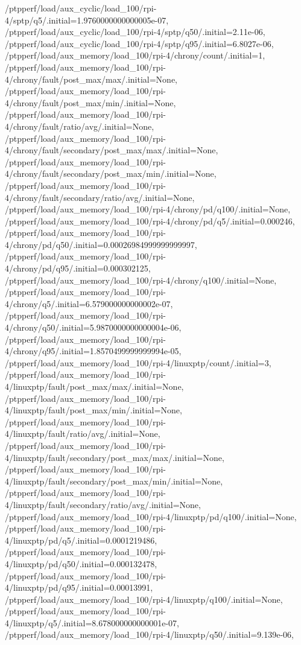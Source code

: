 {    /ptpperf/load/aux_cyclic/load_100/rpi-4/sptp/q5/.initial=1.9760000000000005e-07,
    /ptpperf/load/aux_cyclic/load_100/rpi-4/sptp/q50/.initial=2.11e-06,
    /ptpperf/load/aux_cyclic/load_100/rpi-4/sptp/q95/.initial=6.8027e-06,
    /ptpperf/load/aux_memory/load_100/rpi-4/chrony/count/.initial=1,
    /ptpperf/load/aux_memory/load_100/rpi-4/chrony/fault/post_max/max/.initial=None,
    /ptpperf/load/aux_memory/load_100/rpi-4/chrony/fault/post_max/min/.initial=None,
    /ptpperf/load/aux_memory/load_100/rpi-4/chrony/fault/ratio/avg/.initial=None,
    /ptpperf/load/aux_memory/load_100/rpi-4/chrony/fault/secondary/post_max/max/.initial=None,
    /ptpperf/load/aux_memory/load_100/rpi-4/chrony/fault/secondary/post_max/min/.initial=None,
    /ptpperf/load/aux_memory/load_100/rpi-4/chrony/fault/secondary/ratio/avg/.initial=None,
    /ptpperf/load/aux_memory/load_100/rpi-4/chrony/pd/q100/.initial=None,
    /ptpperf/load/aux_memory/load_100/rpi-4/chrony/pd/q5/.initial=0.000246,
    /ptpperf/load/aux_memory/load_100/rpi-4/chrony/pd/q50/.initial=0.00026984999999999997,
    /ptpperf/load/aux_memory/load_100/rpi-4/chrony/pd/q95/.initial=0.000302125,
    /ptpperf/load/aux_memory/load_100/rpi-4/chrony/q100/.initial=None,
    /ptpperf/load/aux_memory/load_100/rpi-4/chrony/q5/.initial=6.579000000000002e-07,
    /ptpperf/load/aux_memory/load_100/rpi-4/chrony/q50/.initial=5.9870000000000004e-06,
    /ptpperf/load/aux_memory/load_100/rpi-4/chrony/q95/.initial=1.8570499999999994e-05,
    /ptpperf/load/aux_memory/load_100/rpi-4/linuxptp/count/.initial=3,
    /ptpperf/load/aux_memory/load_100/rpi-4/linuxptp/fault/post_max/max/.initial=None,
    /ptpperf/load/aux_memory/load_100/rpi-4/linuxptp/fault/post_max/min/.initial=None,
    /ptpperf/load/aux_memory/load_100/rpi-4/linuxptp/fault/ratio/avg/.initial=None,
    /ptpperf/load/aux_memory/load_100/rpi-4/linuxptp/fault/secondary/post_max/max/.initial=None,
    /ptpperf/load/aux_memory/load_100/rpi-4/linuxptp/fault/secondary/post_max/min/.initial=None,
    /ptpperf/load/aux_memory/load_100/rpi-4/linuxptp/fault/secondary/ratio/avg/.initial=None,
    /ptpperf/load/aux_memory/load_100/rpi-4/linuxptp/pd/q100/.initial=None,
    /ptpperf/load/aux_memory/load_100/rpi-4/linuxptp/pd/q5/.initial=0.0001219486,
    /ptpperf/load/aux_memory/load_100/rpi-4/linuxptp/pd/q50/.initial=0.000132478,
    /ptpperf/load/aux_memory/load_100/rpi-4/linuxptp/pd/q95/.initial=0.00013991,
    /ptpperf/load/aux_memory/load_100/rpi-4/linuxptp/q100/.initial=None,
    /ptpperf/load/aux_memory/load_100/rpi-4/linuxptp/q5/.initial=8.678000000000001e-07,
    /ptpperf/load/aux_memory/load_100/rpi-4/linuxptp/q50/.initial=9.139e-06,
}
